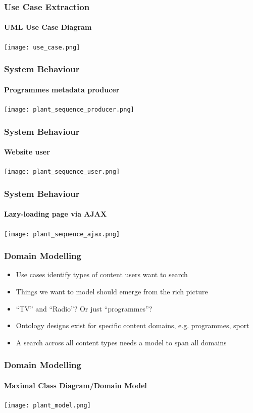 \documentclass{beamer}
\begin{document}
\begin{frame}
  \frametitle{Use Case Extraction}
  \framesubtitle{UML Use Case Diagram}
  \texttt{[image: use\_case.png]}
\end{frame}

\begin{frame}
  \frametitle{System Behaviour}
  \framesubtitle{Programmes metadata producer}
  \texttt{[image: plant\_sequence\_producer.png]}
\end{frame}

\begin{frame}
  \frametitle{System Behaviour}
  \framesubtitle{Website user}
  \begin{center}
    \texttt{[image: plant\_sequence\_user.png]}
  \end{center}
\end{frame}

\begin{frame}
  \frametitle{System Behaviour}
  \framesubtitle{Lazy-loading page via AJAX}
  \begin{center}
    \texttt{[image: plant\_sequence\_ajax.png]}
  \end{center}
\end{frame}

\begin{frame}
  \frametitle{Domain Modelling}
  \begin{itemize}
    \item Use cases identify types of content users want to search
    \item Things we want to model should emerge from the rich picture
    \item ``TV'' and ``Radio''? Or just ``programmes''?
    \item Ontology designs exist for specific content domains, e.g. programmes, sport
    \item A search across all content types needs a model to span all domains
  \end{itemize}
\end{frame}

\begin{frame}
  \frametitle{Domain Modelling}
  \framesubtitle{Maximal Class Diagram/Domain Model}
  \begin{center}
    \pause \texttt{[image: plant\_model.png]}
  \end{center}
\end{frame}
\end{document}
